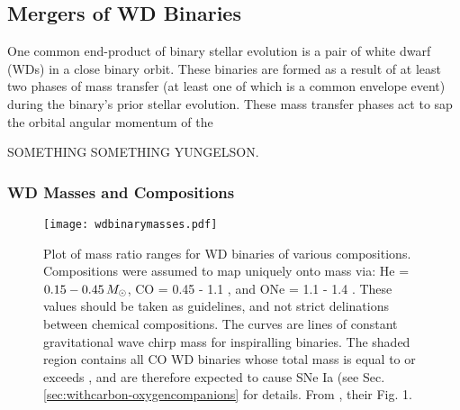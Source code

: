 
\subsection{Mergers of WD Binaries}
\label{ssec:c1_wdmergers_sub}

One common end-product of binary stellar evolution is a pair of white dwarf (WDs) in a close binary orbit.  These binaries are formed as a result of at least two phases of mass transfer (at least one of which is a common envelope event) during the binary's prior stellar evolution.  These mass transfer phases act to sap the orbital angular momentum of the 

SOMETHING SOMETHING YUNGELSON.

\subsubsection{WD Masses and Compositions}

\begin{figure}
\texttt{[image: wdbinarymasses.pdf]}
\caption{Plot of mass ratio ranges for WD binaries of various compositions.  Compositions were assumed to map uniquely onto mass via: He = $0.15 - 0.45\,\Msun$, CO = 0.45 - 1.1 {\Msun}, and ONe = 1.1 - 1.4 {\Msun}.  These values should be taken as guidelines, and not strict delinations between chemical compositions.  The curves are lines of constant gravitational wave chirp mass for inspiralling binaries.  The shaded region contains all CO WD binaries whose total mass is equal to or exceeds {\Mchan}, and are therefore expected to cause SNe Ia (see Sec. \ref{sec:withcarbon-oxygencompanions} for details.  From \cite{mars11}, their Fig. 1.}
\label{fig:c1_wdbinarymasses}
\end{figure}



